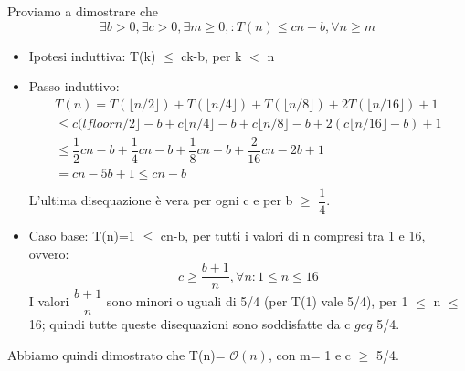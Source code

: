 \documentclass[../cheatSheetAlgoritmi.tex]{subfiles}
\begin{document}
Proviamo a dimostrare che 
\begin{equation*}
  \exists b \text{$>$} 0, \exists c \text{$>$} 0, \exists m \text{$\geq$} 0, : T(n) \text{$\leq$} cn-b, \forall n \text{$\geq$} m
\end{equation*}
\begin{itemize}
	\item Ipotesi induttiva: T(k) $\leq$ ck-b, per k $<$ n
	\item Passo induttivo:
	\begin{equation*}
		\begin{aligned}	
			T(n)= T(\lfloor n/2 \rfloor) + T(\lfloor n/4 \rfloor)+ T(\lfloor n/8 \rfloor)+ 2T(\lfloor n/16 \rfloor) + 1\\
			\text{$\leq$} c(lfloor n/2 \rfloor -b + c\lfloor n/4 \rfloor -b+ c\lfloor n/8 \rfloor -b + 2(c \lfloor n/16 \rfloor -b) + 1\\ 
			\text{$\leq$}  \dfrac{1}{2}cn -b + \dfrac{1}{4}cn -b + \dfrac{1}{8}cn -b + \dfrac{2}{16}cn -2b + 1\\
=  cn -5b + 1 \text{$\leq$} cn -b \\
		\end{aligned}
	\end{equation*}
	L'ultima disequazione è vera per ogni c e per b $\geq$ $\dfrac{1}{4}$. 
	\item Caso base: T(n)=1 $\leq$ cn-b, per tutti i valori di n compresi tra 1 e 16, ovvero: 
	\begin{equation*}
		c \text{$\geq$} \dfrac{b+1}{n}, \forall n: 	\text{$1 \leq n \leq 16$}
	\end{equation*}
	I valori $\dfrac{b+1}{n}$ sono minori o uguali di 5/4 (per T(1) vale 5/4), per 1 $\leq$ n $\leq$ 16; quindi tutte queste disequazioni sono soddisfatte da c $geq$ 5/4. 
\end{itemize}
Abbiamo quindi dimostrato che T(n)= $\mathcal{O}(n)$, con m= 1 e c $\geq$ 5/4.
\end{document}
